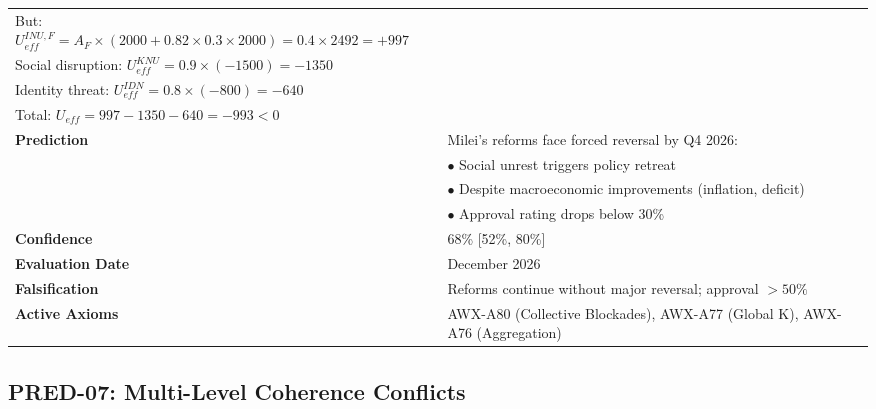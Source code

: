 \begin{table}[htbp]
\begin{tabular}{p{3cm}p{11cm}}
But: $U_{eff}^{INU,F} = A_F \times (2000 + 0.82 \times 0.3 \times 2000) = 0.4 \times 2492 = +997$ \\
Social disruption: $U_{eff}^{KNU} = 0.9 \times (-1500) = -1350$ \\
Identity threat: $U_{eff}^{IDN} = 0.8 \times (-800) = -640$ \\
Total: $U_{eff} = 997 - 1350 - 640 = -993 < 0$ \\
\textbf{Prediction} & Milei's reforms face forced reversal by Q4 2026: \\
& $\bullet$ Social unrest triggers policy retreat \\
& $\bullet$ Despite macroeconomic improvements (inflation, deficit) \\
& $\bullet$ Approval rating drops below 30\% \\
\textbf{Confidence} & 68\% [52\%, 80\%] \\
\textbf{Evaluation Date} & December 2026 \\
\textbf{Falsification} & Reforms continue without major reversal; approval $>50\%$ \\
\textbf{Active Axioms} & AWX-A80 (Collective Blockades), AWX-A77 (Global K), AWX-A76 (Aggregation) \\
\bottomrule
\end{tabular}
\end{table}


\subsection{PRED-07: Multi-Level Coherence Conflicts}
\label{subsec:pred-07-calc}

